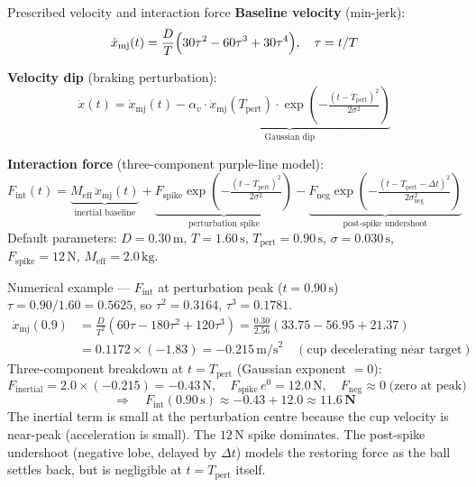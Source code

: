 \documentclass[11pt,a4paper]{article}
\begin{document}
\begin{eqbox}{Prescribed velocity and interaction force}
\textbf{Baseline velocity} (min-jerk):
\begin{equation}
\dot{x}_\text{mj}(t) = \frac{D}{T}\Bigl(30\tau^2 - 60\tau^3 + 30\tau^4\Bigr),
\quad \tau = t/T
\end{equation}

\textbf{Velocity dip} (braking perturbation):
\begin{equation}
\dot{x}(t) = \dot{x}_\text{mj}(t) - \underbrace{\alpha_v \cdot \dot{x}_\text{mj}(T_\text{pert})
\cdot \exp\!\left(-\tfrac{(t-T_\text{pert})^2}{2\sigma^2}\right)}_{\text{Gaussian dip}}
\end{equation}

\textbf{Interaction force} (three-component purple-line model):
\begin{equation}
F_\text{int}(t) = \underbrace{M_\text{eff}\,\ddot{x}_\text{mj}(t)}_{\text{inertial baseline}}
  + \underbrace{F_\text{spike}\exp\!\left(-\tfrac{(t-T_\text{pert})^2}{2\sigma^2}\right)}_{\text{perturbation spike}}
  - \underbrace{F_\text{neg}\exp\!\left(-\tfrac{(t-T_\text{pert}-\Delta t)^2}{2\sigma_\text{neg}^2}\right)}_{\text{post-spike undershoot}}
\end{equation}
Default parameters: $D=0.30\,\text{m}$, $T=1.60\,\text{s}$,
$T_\text{pert}=0.90\,\text{s}$, $\sigma=0.030\,\text{s}$,
$F_\text{spike}=12\,\text{N}$, $M_\text{eff}=2.0\,\text{kg}$.
\end{eqbox}

\begin{notebox}[PipeBlue]{Numerical example --- $F_\text{int}$ at perturbation peak ($t=0.90\,\text{s}$)}
$\tau=0.90/1.60=0.5625$, so $\tau^2=0.3164$, $\tau^3=0.1781$.
\begin{align*}
\ddot{x}_\text{mj}(0.9) &= \frac{D}{T^2}(60\tau-180\tau^2+120\tau^3)
  = \frac{0.30}{2.56}(33.75-56.95+21.37)\\
  &= 0.1172\times(-1.83) = -0.215\,\text{m/s}^2
  \quad(\text{cup decelerating near target})
\end{align*}
Three-component breakdown at $t=T_\text{pert}$ (Gaussian exponent $=0$):
\[
F_\text{inertial}= 2.0\times(-0.215)=-0.43\,\text{N},\quad
F_\text{spike}\,e^{0}=12.0\,\text{N},\quad
F_\text{neg}\approx0\;\text{(zero at peak)}
\]
\[
\Rightarrow\quad F_\text{int}(0.90\,\text{s})\approx -0.43+12.0 \approx \mathbf{11.6\,\text{N}}
\]
The inertial term is small at the perturbation centre because the cup velocity is near-peak
(acceleration is small). The $12\,\text{N}$ spike dominates. The post-spike undershoot
(negative lobe, delayed by $\Delta t$) models the restoring force as the ball settles
back, but is negligible at $t=T_\text{pert}$ itself.
\end{notebox}
\end{document}
